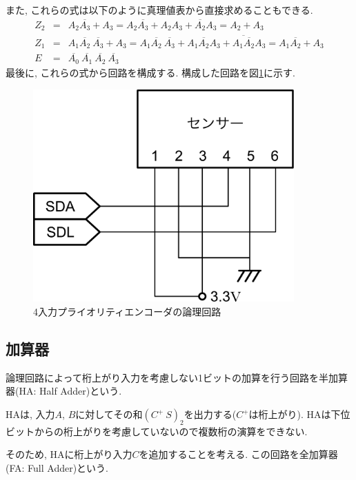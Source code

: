 \documentclass[titlepage]{jsarticle}
\begin{document}
    また, これらの式は以下のように真理値表から直接求めることもできる.
    \begin{eqnarray*}
      Z_2 &=& A_2 \overline{A_3} + A_3 =
        A_2 \overline{A_3} + A_2A_3 + \overline{A_2}A_3 =
        A_2 + A_3 \\
      Z_1 &=& A_1 \overline{A_2} \ \overline{A_3} + A_3 =
        A_1 \overline{A_2} \ \overline{A_3} + A_1 \overline{A_2}A_3 +
          \overline{A_1 \overline{A_2}} A_3 =
        A_1 \overline{A_2} + A_3 \\
      E &=& \overline{A_0} \ \overline{A_1} \ \overline{A_2} \ \overline{A_3}
    \end{eqnarray*}
    最後に, これらの式から回路を構成する.
    構成した回路を図\ref{fig:priority_encoder}に示す.
    \begin{figure}[h]
      \centering
      \includegraphics[width=10cm]{images/haisen.pdf}
      \caption{4入力プライオリティエンコーダの論理回路}
      \label{fig:priority_encoder}
    \end{figure}
  \subsection{加算器} \label{ssec:FA}
    論理回路によって桁上がり入力を考慮しない1ビットの加算を行う回路を半加算器(HA: Half Adder)という.

    HAは, 入力$A$, $B$に対してその和$(C^+ \ S)_2$を出力する($C^+$は桁上がり).
    HAは下位ビットからの桁上がりを考慮していないので複数桁の演算をできない.

    そのため, HAに桁上がり入力$C$を追加することを考える.
    この回路を全加算器(FA: Full Adder)という.
\end{document}
